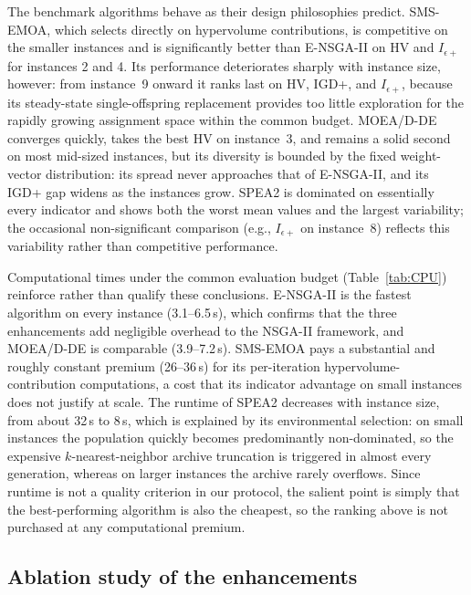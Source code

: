 \documentclass[11pt, a4paper]{article}
\begin{document}
The benchmark algorithms behave as their design philosophies predict.
SMS-EMOA, which selects directly on hypervolume contributions, is
competitive on the smaller instances and is significantly better than
E-NSGA-II on HV and $I_{\epsilon+}$ for instances 2 and 4. Its
performance deteriorates sharply with instance size, however: from
instance~9 onward it ranks last on HV, IGD+, and $I_{\epsilon+}$,
because its steady-state single-offspring replacement provides too
little exploration for the rapidly growing assignment space within the
common budget. MOEA/D-DE converges quickly, takes the best HV on
instance~3, and remains a solid second on most mid-sized instances,
but its diversity is bounded by the fixed weight-vector distribution:
its spread never approaches that of E-NSGA-II, and its IGD+ gap widens
as the instances grow. SPEA2 is dominated on essentially every
indicator and shows both the worst mean values and the largest
variability; the occasional non-significant comparison (e.g.,
$I_{\epsilon+}$ on instance~8) reflects this variability rather than
competitive performance.

Computational times under the common evaluation budget
(Table~\ref{tab:CPU}) reinforce rather than qualify these conclusions.
E-NSGA-II is the fastest algorithm on every instance (3.1--6.5\,s),
which confirms that the three enhancements add negligible overhead to
the NSGA-II framework, and MOEA/D-DE is comparable (3.9--7.2\,s).
SMS-EMOA pays a substantial and roughly constant premium (26--36\,s)
for its per-iteration hypervolume-contribution computations, a cost
that its indicator advantage on small instances does not justify at
scale. The runtime of SPEA2 decreases with instance size, from about
32\,s to 8\,s, which is explained by its environmental selection: on
small instances the population quickly becomes predominantly
non-dominated, so the expensive $k$-nearest-neighbor archive
truncation is triggered in almost every generation, whereas on larger
instances the archive rarely overflows. Since runtime is not a quality
criterion in our protocol, the salient point is simply that the
best-performing algorithm is also the cheapest, so the ranking above
is not purchased at any computational premium.

\hypertarget{ablation-study-of-the-enhancements}{%
\subsection{Ablation study of the
enhancements}\label{ablation-study-of-the-enhancements}}
\end{document}
